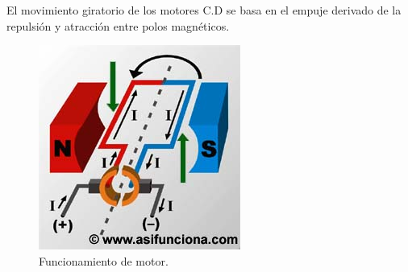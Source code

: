 \documentclass[12pt,letterpaper]{article}
\begin{document}
\newpage

El movimiento giratorio de los motores C.D se basa en el empuje derivado de la repulsión y atracción entre polos magnéticos.
\ 

\begin{figure}[h!]
\begin{center}
\includegraphics[scale=0.6]{Motor.jpg} 
\caption{Funcionamiento de motor.} 
\end{center}
\end{figure}
\end{document}
